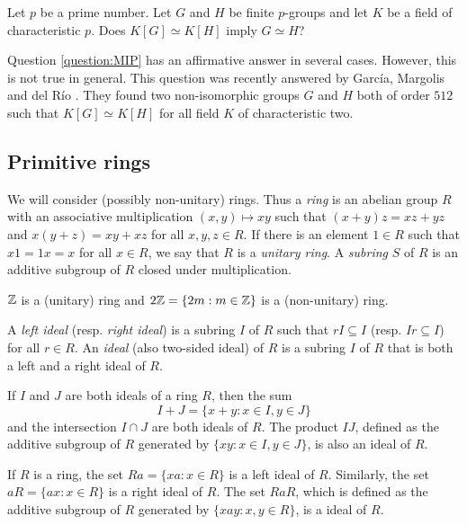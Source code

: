 \begin{question}
\label{question:MIP}
    Let $p$ be a prime number. Let
    $G$ and $H$ be finite $p$-groups and let $K$ be a field of characteristic $p$.
    Does $K[G]\simeq K[H]$ imply $G\simeq H$?
\end{question}

Question \ref{question:MIP} has an affirmative answer in several cases. However,
this is not true in general. This question was recently answered by Garc\'ia, Margolis and
del R\'io \cite{MR4373245}. They found two non-isomorphic groups $G$ and $H$ both of order $512$
such that $K[G]\simeq K[H]$ for all field $K$
of characteristic two.

\subsection{Primitive rings}
\label{Primitive rings}

We will consider (possibly non-unitary) rings. Thus  
a \emph{ring} is an abelian group $R$ with an associative multiplication 
$(x,y)\mapsto xy$ such that $(x+y)z=xz+yz$ and $x(y+z)=xy+xz$ for all $x,y,z\in
R$. If there is an element $1\in R$ such that $x1=1x=x$ for all $x\in R$, we 
say that $R$ is a \emph{unitary ring}.  A \emph{subring} $S$ of $R$ is an additive
subgroup of $R$ closed under multiplication. 

\begin{example}
    $\mathbb{Z}$ is a (unitary) ring and 
	$2\mathbb{Z}=\{2m:m\in\mathbb{Z}\}$ is a (non-unitary) ring.  
\end{example}

A \emph{left ideal} (resp. \emph{right ideal}) is a subring $I$ of $R$ such that 
$rI\subseteq I$ (resp. $Ir\subseteq I$) for all $r\in R$. An \emph{ideal}
(also two-sided ideal) of $R$ is a subring $I$ of $R$ that is both a left and a right ideal of $R$.

\begin{example}
	If $I$ and $J$ are both ideals of a ring $R$, then the sum 
 \[
 I+J=\{x+y:x\in I,y\in J\}
 \]
 and
	the intersection $I\cap J$ are both ideals of $R$. The product $IJ$, defined as the additive
	subgroup of $R$ generated by $\{xy:x\in I,y\in J\}$, is also an ideal of $R$. 
\end{example}

\begin{example}
	If $R$ is a ring, the set $Ra =\{xa: x\in R\}$ is a left ideal
	of $R$. Similarly, the set $aR =\{ax: x\in R\}$ is a right ideal of $R$. The set $RaR$, which is
	defined as the additive subgroup of $R$ generated by $\{xay: x, y\in R\}$, is a
	ideal of $R$.
\end{example}


